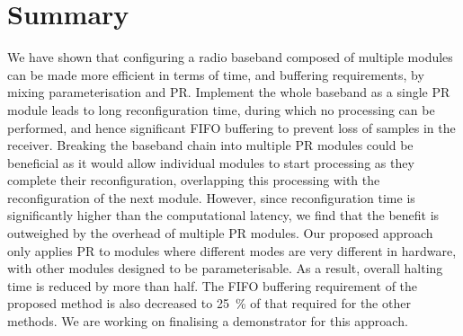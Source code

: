 \section{Summary}
We have shown that configuring a radio baseband composed of multiple modules can be made more efficient in terms of time, and buffering requirements, by mixing parameterisation and PR.
Implement the whole baseband as a single PR module leads to long reconfiguration time, during which no processing can be performed, and hence significant FIFO buffering to prevent loss of samples in the receiver.
Breaking the baseband chain into multiple PR modules could be beneficial as it would allow individual modules to start processing as they complete their reconfiguration, overlapping this processing with the reconfiguration of the next module. However, since reconfiguration time is significantly higher than the computational latency, we find that the benefit is outweighed by the overhead of multiple PR modules.
Our proposed approach only applies PR to modules where different modes are very different in hardware, with other modules designed to be parameterisable. As a result, overall halting time is reduced by more than half.
The FIFO buffering requirement of the proposed method is also decreased to 25~\% of that required for the other methods.
We are working on finalising a demonstrator for this approach.